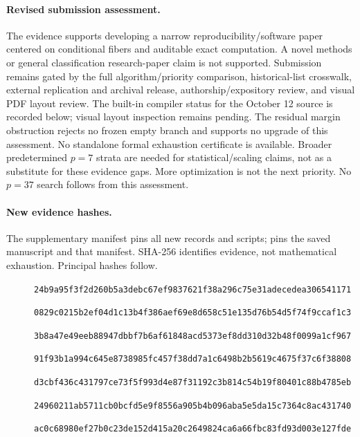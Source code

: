 \documentclass[11pt]{article}
\begin{document}
\paragraph{Revised submission assessment.}
The evidence supports developing a narrow reproducibility/software paper
centered on conditional fibers and auditable exact computation. A novel
methods or general classification research-paper claim is not supported.
Submission remains gated by the full algorithm/priority comparison,
historical-list crosswalk, external replication and archival release,
authorship/expository review, and visual PDF layout review. The built-in
compiler status for the October 12 source is recorded below; visual layout
inspection remains pending. The residual margin obstruction rejects no
frozen empty branch and supports no upgrade of this assessment.
No standalone formal exhaustion certificate is available. Broader
predetermined $p=7$ strata are needed for statistical/scaling claims, not
as a substitute for these evidence gaps. More optimization is not the next
priority. No $p=37$ search follows from this assessment.

\paragraph{New evidence hashes.}
The supplementary manifest 
pins all new records and scripts;  pins
the saved manuscript and that manifest. SHA-256 identifies evidence, not
mathematical exhaustion. Principal hashes follow.
\begin{description}
\item[\normalfont\footnotesize{}] \hfill\break
{\footnotesize\texttt{24b9a95f3f2d260b5a3debc67ef9837621f38a296c75e31adecedea306541171}}
\item[\normalfont\footnotesize{}] \hfill\break
{\footnotesize\texttt{0829c0215b2ef04d1c13b4f386aef69e8d658c51e135d76b54d5f74f9ccaf1c3}}
\item[\normalfont\footnotesize{}] \hfill\break
{\footnotesize\texttt{3b8a47e49eeb88947dbbf7b6af61848acd5373ef8dd310d32b48f0099a1cf967}}
\item[\normalfont\footnotesize{}] \hfill\break
{\footnotesize\texttt{91f93b1a994c645e8738985fc457f38dd7a1c6498b2b5619c4675f37c6f38808}}
\item[\normalfont\footnotesize{}] \hfill\break
{\footnotesize\texttt{d3cbf436c431797ce73f5f993d4e87f31192c3b814c54b19f80401c88b4785eb}}
\item[\normalfont\footnotesize{}] \hfill\break
{\footnotesize\texttt{24960211ab5711cb0bcfd5e9f8556a905b4b096aba5e5da15c7364c8ac431740}}
\item[\normalfont\footnotesize{}] \hfill\break
{\footnotesize\texttt{ac0c68980ef27b0c23de152d415a20c2649824ca6a66fbc83fd93d003e127fde}}
\end{description}
\end{document}
